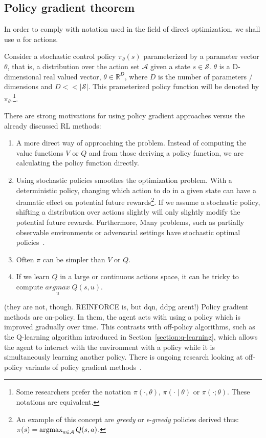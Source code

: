 \documentclass{../main.tex}{}
\begin{document}
\subsection{Policy gradient theorem}

In order to comply with notation used in the field of direct optimization, we shall use $u$ for actions.

Consider a stochastic control policy  $\pi_{\theta}(s)$ parameterized by a parameter vector $\theta$, that is, a distribution over the action set $\mathcal{A}$ given a state $s \in \mathcal{S}$. $\theta$ is a D-dimensional real valued vector,  $\theta \in \mathbb{R}^{D}$, where $D$ is the number of parameters / dimensions and $D << |\mathcal{S}|$. This prameterized policy function will be denoted by $\pi_{\theta}$.\footnote{Some researchers prefer the notation $\pi(\cdot, \theta)$, $\pi(\cdot \mid \theta)$ or $\pi(\cdot; \theta)$. These notations are equivalent.}. 

There are strong motivations for using policy gradient approaches versus the already discussed RL methods:
\begin{enumerate}
\item A more direct way of approaching the problem. Instead of computing the value functions $V$ or $Q$ and from those deriving a policy function, we are calculating the policy function directly.
\item Using stochastic policies smoothes the optimization problem. With a deterministic policy, changing which action to do in a given state can have a dramatic effect on potential future rewards\footnote{An example of this concept are \textit{greedy} or $\epsilon$-\textit{greedy} policies derived thus: $\pi(s) = \operatorname*{argmax}_{a \in \mathcal{A}} Q(s,a)$.}. If we assume a stochastic policy, shifting a distribution over actions slightly will only slightly modify the potential future rewards. Furthermore, Many problems, such as partially observable environments or adversarial settings have stochastic optimal policies~\citep{Degris2012}.
\item Often $\pi$ can be simpler than $V$ or $Q$.
\item If we learn $Q$ in a large or continuous actions space, it can be tricky to compute $\underset{\text{u}}{argmax}\; Q(s,u)$.
\end{enumerate}
 
(they are not, though. REINFORCE is, but dqn, ddpg arent!) Policy gradient methods are on-policy. In them, the agent acts with using a policy which is improved gradually over time. This contrasts with off-policy algorithms, such as the Q-learning algorithm introduced in Section~\ref{section:q-learning}, which allows the agent to interact with the environment with a policy while it is simultaneously learning another policy. There is ongoing research looking at off-policy variants of policy gradient methods~\citep{Mnih2013, Mnih2016}. 
\end{document}
